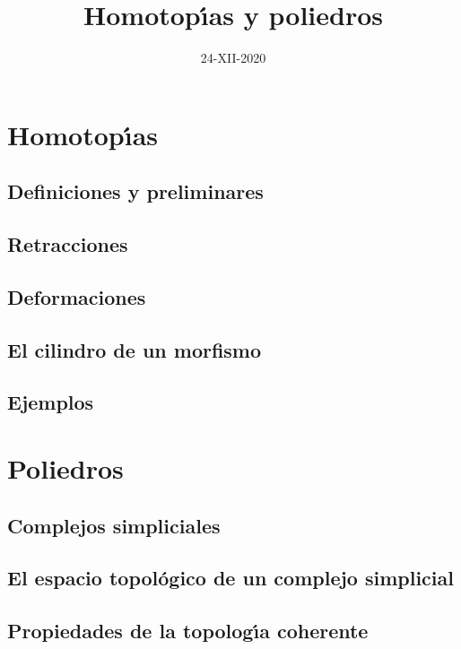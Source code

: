 \documentclass[11pt]{report}
\title{Homotop\'{\i}as y poliedros}
\author{}
\date{24-XII-2020} %
\begin{document}
\maketitle
\tableofcontents



\chapter{Homotop\'{\i}as}
\section{Definiciones y preliminares}

%
\section{Retracciones}

%
\section{Deformaciones}

%
\section{El cilindro de un morfismo}

%
\section{Ejemplos}

%
%

\chapter{Poliedros}
\section{Complejos simpliciales}

%
\section{El espacio topol\'{o}gico de un complejo simplicial}

%
\section{Propiedades de la topolog\'{\i}a coherente}

%
\end{document}
